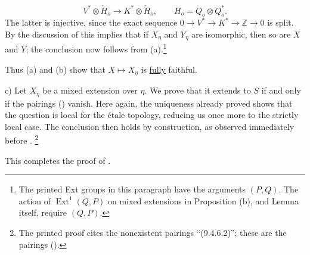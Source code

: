\begin{equation*}
V^*\otimes\check H_o\longrightarrow K^*\otimes\check H_o,
\qquad H_o=Q_o\otimes Q_o^*.
\end{equation*}
The latter is injective, since the exact sequence
$0\longrightarrow V^*\longrightarrow K^*\longrightarrow\mathbb Z
\longrightarrow0$ is split. By the discussion of  this implies that if
$X_\eta$ and $Y_\eta$ are isomorphic, then so are $X$ and $Y$; the
conclusion now follows from (a).\footnote{The printed Ext groups in this
paragraph have the arguments $(P,Q)$. The action of
$\operatorname{Ext}^1(Q,P)$ on mixed extensions in Proposition (b),
and Lemma  itself, require $(Q,P)$.}

Thus (a) and (b) show that $X\longmapsto X_\eta$ is \underline{fully} faithful.

\smallskip
\noindent
c) Let $X_\eta$ be a mixed extension over $\eta$. We prove that it extends
to $S$ if and only if the pairings () vanish. Here again, the
uniqueness already proved shows that the question is local for the étale
topology, reducing us once more to the strictly local case. The conclusion
then holds by construction, as observed immediately before .
\footnote{The printed proof cites the nonexistent pairings
``(9.4.6.2)''; these are the pairings ().}

This completes the proof of .
